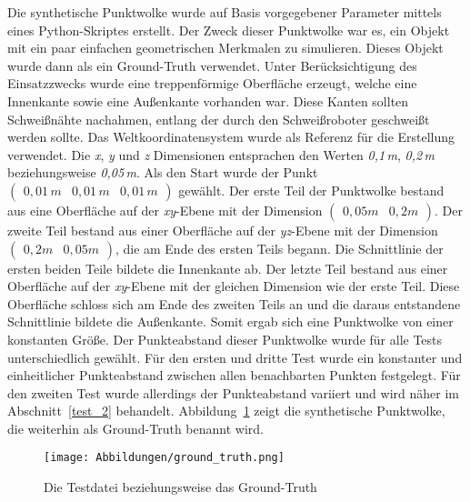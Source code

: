 Die synthetische Punktwolke wurde auf Basis vorgegebener Parameter mittels eines Python-Skriptes erstellt. Der Zweck dieser Punktwolke war es, ein Objekt mit ein paar einfachen geometrischen Merkmalen zu simulieren. Dieses Objekt wurde dann als ein Ground-Truth verwendet. Unter Berücksichtigung des Einsatzzwecks wurde eine treppenförmige Oberfläche erzeugt, welche eine Innenkante sowie eine Außenkante vorhanden war. Diese Kanten sollten Schweißnähte nachahmen, entlang der durch den Schweißroboter geschweißt werden sollte. Das Weltkoordinatensystem wurde als Referenz für die Erstellung verwendet. Die \textit{x}, \textit{y} und \textit{z} Dimensionen entsprachen den Werten \textit{0,1\,m}, \textit{0,2\,m} beziehungsweise \textit{0,05\,m}. Als den Start wurde der Punkt $\left(\begin{smallmatrix}
	0,01\,m & 0,01\,m & 0,01\,m
\end{smallmatrix}\right)$ gewählt. Der erste Teil der Punktwolke bestand aus eine Oberfläche auf der \textit{xy}-Ebene mit der Dimension $\left(\begin{smallmatrix}
0,05m & 0,2m
\end{smallmatrix}\right)$. Der zweite Teil bestand aus einer Oberfläche auf der \textit{yz}-Ebene mit der Dimension $\left(\begin{smallmatrix}
0,2m & 0,05m
\end{smallmatrix}\right)$, die am Ende des ersten Teils begann. Die Schnittlinie der ersten beiden Teile bildete die Innenkante ab. Der letzte Teil bestand aus einer Oberfläche auf der \textit{xy}-Ebene mit der gleichen Dimension wie der erste Teil. Diese Oberfläche schloss sich am Ende des zweiten Teils an und die daraus entstandene Schnittlinie bildete die Außenkante. Somit ergab sich eine Punktwolke von einer konstanten Größe. Der Punkteabstand dieser Punktwolke wurde für alle Tests unterschiedlich gewählt. Für den ersten und dritte Test wurde ein konstanter und einheitlicher Punkteabstand zwischen allen benachbarten Punkten festgelegt. Für den zweiten Test wurde allerdings der Punkteabstand variiert und wird näher im Abschnitt~\ref{test_2} behandelt. Abbildung~\ref{fig: ground_truth} zeigt die synthetische Punktwolke, die weiterhin als Ground-Truth benannt wird. 

\begin{figure}[t]
	\texttt{[image: Abbildungen/ground\_truth.png]}
	\centering
	\caption[Ground-Truth Datei]{Die Testdatei beziehungsweise das Ground-Truth}
	\label{fig: ground_truth}
\end{figure}

